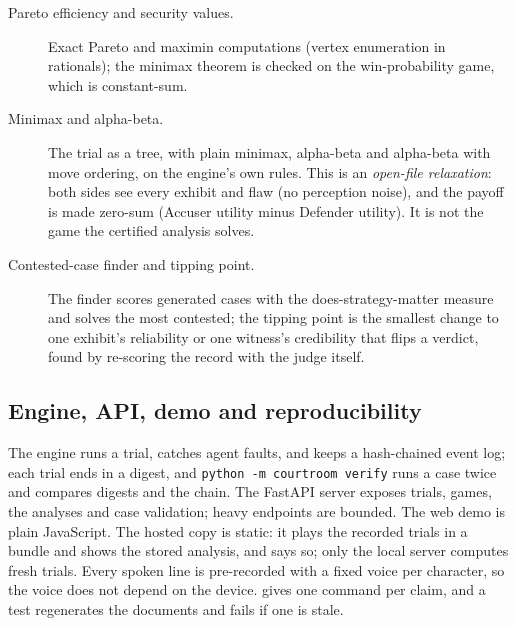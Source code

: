 \begin{description}
\item[Pareto efficiency and security values.] Exact Pareto and maximin computations (vertex enumeration in rationals); the minimax theorem is checked on the win-probability game, which is constant-sum.
\item[Minimax and alpha-beta.] The trial as a tree, with plain minimax, alpha-beta and alpha-beta with move ordering, on the engine's own rules. This is an \emph{open-file relaxation}: both sides see every exhibit and flaw (no perception noise), and the payoff is made zero-sum (Accuser utility minus Defender utility). It is not the game the certified analysis solves.
\item[Contested-case finder and tipping point.] The finder scores generated cases with the does-strategy-matter measure and solves the most contested; the tipping point is the smallest change to one exhibit's reliability or one witness's credibility that flips a verdict, found by re-scoring the record with the judge itself.
\end{description}

\subsection{Engine, API, demo and reproducibility}\label{sec:repro}
The engine runs a trial, catches agent faults, and keeps a hash-chained event log; each trial ends in a digest, and \texttt{python -m courtroom verify} runs a case twice and compares digests and the chain. The FastAPI server exposes trials, games, the analyses and case validation; heavy endpoints are bounded. The web demo is plain JavaScript. The hosted copy is static: it plays the \ReplayTotal{} recorded trials in a bundle and shows the stored analysis, and says so; only the local server computes fresh trials. Every spoken line is pre-recorded with a fixed voice per character, so the voice does not depend on the device.  gives one command per claim, and a test regenerates the documents and fails if one is stale.
